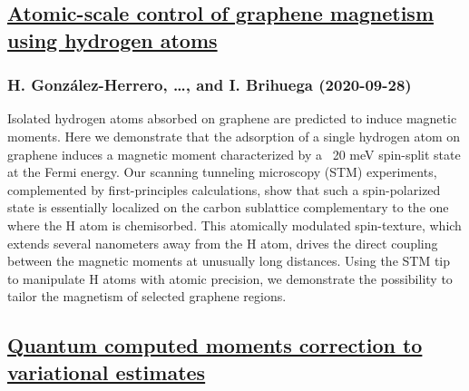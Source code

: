 \subsection*{\href{http://arxiv.org/abs/2009.13150v1}{Atomic-scale control of graphene magnetism using hydrogen atoms}}
\subsubsection*{H. González-Herrero, \dots, and I. Brihuega (2020-09-28)}
Isolated hydrogen atoms absorbed on graphene are predicted to induce magnetic
moments. Here we demonstrate that the adsorption of a single hydrogen atom on
graphene induces a magnetic moment characterized by a ~20 meV spin-split state
at the Fermi energy. Our scanning tunneling microscopy (STM) experiments,
complemented by first-principles calculations, show that such a spin-polarized
state is essentially localized on the carbon sublattice complementary to the
one where the H atom is chemisorbed. This atomically modulated spin-texture,
which extends several nanometers away from the H atom, drives the direct
coupling between the magnetic moments at unusually long distances. Using the
STM tip to manipulate H atoms with atomic precision, we demonstrate the
possibility to tailor the magnetism of selected graphene regions.

\subsection*{\href{http://arxiv.org/abs/2009.13140v1}{Quantum computed moments correction to variational estimates}}
